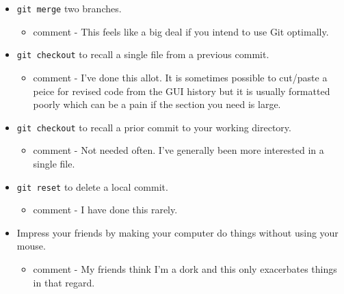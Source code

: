 \documentclass[
  letterpaper,
  DIV=11,
  numbers=noendperiod]{scrreprt}
\providecommand{\tightlist}{%
  \setlength{\itemsep}{0pt}\setlength{\parskip}{0pt}}\usepackage{longtable,booktabs,array}
\begin{document}
\begin{itemize}
\item
  \texttt{git\ merge} two branches.

  \begin{itemize}
  \tightlist
  \item
    comment - This feels like a big deal if you intend to use Git
    optimally.
  \end{itemize}
\item
  \texttt{git\ checkout} to recall a single file from a previous commit.

  \begin{itemize}
  \tightlist
  \item
    comment - I've done this allot. It is sometimes possible to
    cut/paste a peice for revised code from the GUI history but it is
    usually formatted poorly which can be a pain if the section you need
    is large.
  \end{itemize}
\item
  \texttt{git\ checkout} to recall a prior commit to your working
  directory.

  \begin{itemize}
  \tightlist
  \item
    comment - Not needed often. I've generally been more interested in a
    single file.
  \end{itemize}
\item
  \texttt{git\ reset} to delete a local commit.

  \begin{itemize}
  \tightlist
  \item
    comment - I have done this rarely.
  \end{itemize}
\item
  Impress your friends by making your computer do things without using
  your mouse.

  \begin{itemize}
  \tightlist
  \item
    comment - My friends think I'm a dork and this only exacerbates
    things in that regard.
  \end{itemize}
\end{itemize}
\end{document}
